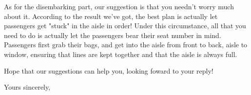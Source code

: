 	As for the disembarking part, our suggestion is that you needn't worry much about it. According to the result we've got, the best plan is actually let passengers get "stuck" in the aisle in order! Under this circumstance, all that you need to do is actually let the passengers bear their seat number in mind. Passengers first grab their bags, and get into the aisle from front to back, aisle to window, ensuring that lines are kept together and that the aisle is always full.

	Hope that our suggestions can help you, looking foward to your reply!

	\noindent Yours sincerely,

	\noindent {}